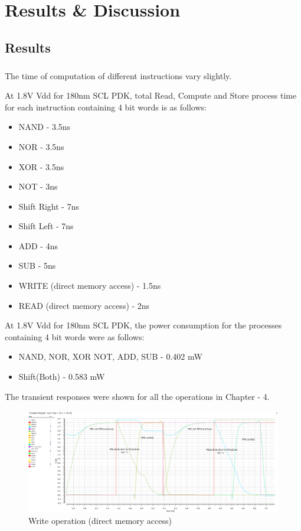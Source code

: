 %
%
\let\textcircled=\pgftextcircled
\chapter{Results \& Discussion}
\label{chap:results}

\section{Results}
\paragraph{}

The time of computation of different instructions vary slightly. 

At 1.8V Vdd for 180nm SCL PDK, total Read, Compute and Store process time for each instruction containing 4 bit words is as follows:
\begin{itemize}
\item NAND - 3.5ns
\item NOR - 3.5ns
\item XOR - 3.5ns
\item NOT - 3ns
\item Shift Right - 7ns
\item Shift Left - 7ns
\item ADD - 4ns
\item SUB - 5ns
\item WRITE (direct memory access) - 1.5ns
\item READ (direct memory access) - 2ns
\end{itemize}

At 1.8V Vdd for 180nm SCL PDK, the power consumption for the processes containing 4 bit words were as follows:
\begin{itemize}
\item NAND, NOR, XOR NOT, ADD, SUB - 0.402 mW
\item Shift(Both) - 0.583 mW
\end{itemize}

The transient responses were shown for all the operations in Chapter - 4.

\begin{figure}[H]
\centering
\includegraphics[width=1.0\textwidth]{write_with_peripherals.png}
\caption{Write operation (direct memory access)}
\label{fig:Figure}
\end{figure}

